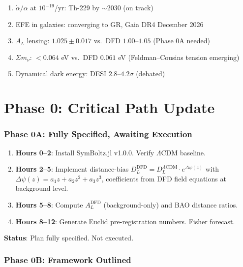 \documentclass[11pt,a4paper]{article}
\begin{document}
\begin{enumerate}
\item $\dot{\alpha}/\alpha$ at $10^{-19}$/yr: Th-229 by $\sim$2030 (on track)
\item EFE in galaxies: converging to GR, Gaia DR4 December 2026
\item $A_L$ lensing: $1.025 \pm 0.017$ vs.\ DFD $1.00$--$1.05$ (Phase 0A needed)
\item $\Sigma m_\nu$: $< 0.064$ eV vs.\ DFD $0.061$ eV (Feldman--Cousins tension emerging)
\item Dynamical dark energy: DESI $2.8$--$4.2\sigma$ (debated)
\end{enumerate}


\part{Phase 0: Critical Path Update}

\section{Phase 0A: Fully Specified, Awaiting Execution}

\begin{tcolorbox}[colback=green!5!white, colframe=green!60!black,
  title={Phase 0A: 12-Hour Execution Plan --- Ready}]
\begin{enumerate}
\item \textbf{Hours 0--2}: Install SymBoltz.jl v1.0.0. Verify $\Lambda$CDM baseline.
\item \textbf{Hours 2--5}: Implement distance-bias $D_L^{\text{DFD}} = D_L^{\Lambda\text{CDM}} \cdot e^{\Delta\psi(z)}$ with $\Delta\psi(z) = a_1 z + a_2 z^2 + a_3 z^3$, coefficients from DFD field equations at background level.
\item \textbf{Hours 5--8}: Compute $A_L^{\text{DFD}}$ (background-only) and BAO distance ratios.
\item \textbf{Hours 8--12}: Generate Euclid pre-registration numbers. Fisher forecast.
\end{enumerate}

\textbf{Status}: Plan fully specified. Not executed.
\end{tcolorbox}

\section{Phase 0B: Framework Outlined}
\end{document}
